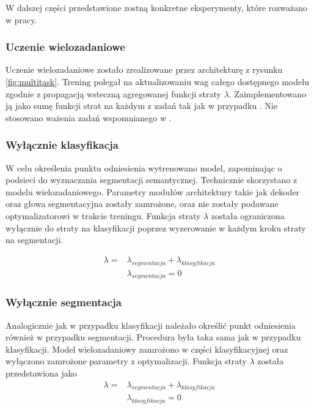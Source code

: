 W dalszej części przedstawione zostną konkretne eksperymenty, które rozważano w pracy.

\subsubsection{Uczenie wielozadaniowe}
Uczenie wielozadaniowe zostało zrealizowane przez architekturę z rysunku \ref{fig:multitask}. Trening polegał na aktualizowaniu wag całego dostępnego modelu zgodnie z propagacją wsteczną agregowanej funkcji straty $\lambda$. Zaimplementowano ją jako sumę funkcji strat na każdym z zadań tak jak w przypadku \cite{mehta2018net}. Nie stosowano ważenia zadań wspomnianego w \cite{9892852}.

\subsubsection{Wyłącznie klasyfikacja}
W celu określenia punktu odniesienia wytrenowano model, zapominając o podsieci do wyznaczania segmentacji semantycznej. Technicznie skorzystano z modelu wielozadaniowego. Parametry modułów architektury takie jak dekoder oraz głowa segmentacyjna zostały zamrożone, oraz nie zostały podawane optymalizatorowi w trakcie treningu. Funkcja straty $\lambda$ została ograniczona wyłącznie do straty na klasyfikacji poprzez wyzerowanie w każdym kroku straty na segmentacji.

\begin{align*}
\lambda  = & \lambda_{segmentacja} + \lambda_{klasyfikacja} \\
           & \lambda_{segmentacja} = 0
\end{align*}
\subsubsection{Wyłącznie segmentacja}
Analogicznie jak w przypadku klasyfikacji należało określić punkt odniesienia również w przypadku segmentacji. Procedura była taka sama jak w przypadku klasyfikacji. Model wielozadaniowy zamrożono w części klasyfikacyjnej oraz wyłączono zamrożone parametry z optymalizacji. Funkcja straty $\lambda$ została przedstawiona jako
\begin{align*}
\lambda = & \lambda_{segmentacja} + \lambda_{klasyfikacja} \\
          & \lambda_{klasyfikacja} = 0
\end{align*}
